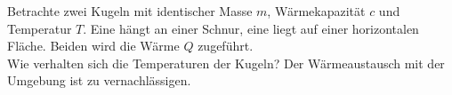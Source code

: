 \begin{Exercise}[label = Zwei Kugeln, title = Zwei Kugeln, difficulty = 4, origin = IPhO 1967]
Betrachte zwei Kugeln mit identischer Masse $m$, Wärmekapazität $c$ und Temperatur $T$. Eine hängt an einer Schnur, eine liegt auf einer horizontalen Fläche. Beiden wird die Wärme $Q$ zugeführt. \\
Wie verhalten sich die Temperaturen der Kugeln? Der Wärmeaustausch mit der Umgebung ist zu vernachlässigen.
\end{Exercise}